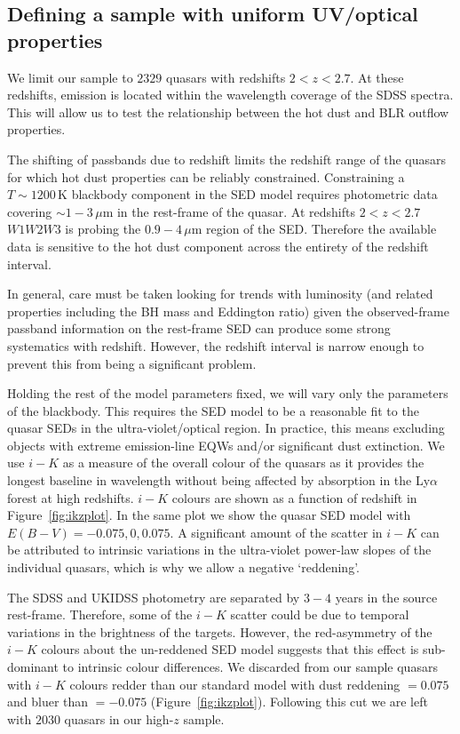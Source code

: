 \subsection{Defining a sample with uniform UV/optical properties}
\label{sec:ch5-hotdustsample}

We limit our sample to $2329$ quasars with redshifts $2 < z < 2.7$. 
At these redshifts,  emission is located within the wavelength coverage of the SDSS spectra.
This will allow us to test the relationship between the hot dust and BLR outflow properties. 

The shifting of passbands due to redshift limits the redshift range of the quasars for which hot dust properties can be reliably constrained.
Constraining a $T\sim1200$\,K blackbody component in the SED model requires photometric data covering $\sim1-3$\,$\mu$m in the rest-frame of the quasar. 
At redshifts $2 < z < 2.7$ $W1W2W3$ is probing the $0.9-4$\,$\mu$m region of the SED. 
Therefore the available data is sensitive to the hot dust component across the entirety of the redshift interval. 

In general, care must be taken looking for trends with luminosity (and related properties including the BH mass and Eddington ratio) given the observed-frame passband information on the rest-frame SED can produce some strong systematics with redshift.
However, the redshift interval is narrow enough to prevent this from being a significant problem. 

Holding the rest of the model parameters fixed, we will vary only the parameters of the blackbody. 
This requires the SED model to be a reasonable fit to the quasar SEDs in the ultra-violet/optical region. 
In practice, this means excluding objects with extreme emission-line EQWs and/or significant dust extinction.
We use $i-K$ as a measure of the overall colour of the quasars as it provides the longest baseline in wavelength without being affected by absorption in the Ly$\alpha$ forest at high redshifts. 
$i-K$ colours are shown as a function of redshift in Figure~\ref{fig:ikzplot}.
In the same plot we show the quasar SED model with $E(B-V)=-0.075,0,0.075$. 
A significant amount of the scatter in $i-K$ can be attributed to intrinsic variations in the ultra-violet power-law slopes of the individual quasars, which is why we allow a negative `reddening'. 

The SDSS and UKIDSS photometry are separated by $3-4$ years in the source rest-frame. 
Therefore, some of the $i-K$ scatter could be due to temporal variations in the brightness of the targets. 
However, the red-asymmetry of the $i-K$ colours about the un-reddened SED model suggests that this effect is sub-dominant to intrinsic colour differences. 
We discarded from our sample quasars with $i - K$ colours redder than our standard model with dust reddening \ebv $= 0.075$ and bluer than \ebv $=-0.075$ (Figure~\ref{fig:ikzplot}). 
Following this cut we are left with $2030$ quasars in our high-$z$ sample. 

